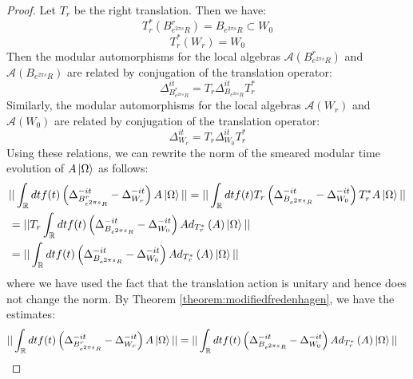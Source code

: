 \documentclass[a4paper,11pt]{article}
\theoremstyle{definition}
\newcommand{\lb}{\left(}
\newcommand{\rb}{\right)}
\begin{document}
\begin{proof}
    Let $T_r$ be the right translation. Then we have:
    \begin{equation}
        T_r^*\lb B^r_{e^{2\pi s}R}\rb = B_{e^{2\pi s}R}\subset W_0
    \end{equation}
    \begin{equation}
        T_r^*\lb W_r \rb = W_0
    \end{equation}
    Then the modular automorphisms for the local algebras $\mathcal{A}\lb B^r_{e^{2\pi s}R}\rb$ and $\mathcal{A}\lb B_{e^{2\pi s}R} \rb$ are related by conjugation of the translation operator:
    \begin{equation}
        \Delta^{it}_{B^r_{e^{2\pi s}R}} = T_r\Delta^{it}_{B_{e^{2\pi s}R}} T_r^*
    \end{equation}
    Similarly, the modular automorphisms for the local algebras $\mathcal{A}\lb W_r\rb$ and $\mathcal{A}\lb W_0\rb$ are related by conjugation of the translation operator:
    \begin{equation}
        \Delta^{it}_{W_r} = T_r\Delta^{it}_{W_0}T_r^*
    \end{equation}
    Using these relations, we can rewrite the norm of the smeared modular time evolution of $A\ket{\Omega}$ as follows:
    \begin{align}
        \begin{split}
            &||\int_\mathbb{R} dt f(t)\lb\Delta^{-it}_{B^r_{e^{2\pi s}R}} - \Delta^{-it}_{W_r}\rb A\ket{\Omega}|| = ||\int_\mathbb{R} dt f(t)T_r\lb\Delta^{-it}_{B_{e^{2\pi s}R}} - \Delta^{-it}_{W_0}\rb T^*_r A\ket{\Omega}||
            \\&
            =||T_r\int_\mathbb{R} dt f(t) \lb\Delta^{-it}_{B_{e^{2\pi s}R}}-\Delta^{-it}_{W_0}\rb Ad_{T_r^*}\lb A\rb\ket{\Omega}||
            \\&=||\int_\mathbb{R} dt f(t) \lb \Delta^{-it}_{B_{e^{2\pi s}R}} - \Delta^{-it}_{W_0}\rb Ad_{T^*_r}\lb A\rb\ket{\Omega}||
        \end{split}
    \end{align}
    where we have used the fact that the translation action is unitary and hence does not change the norm. By Theorem \ref{theorem:modifiedfredenhagen}, we have the estimates:
    \begin{align}
        \begin{split}
            &||\int_\mathbb{R} dt f(t) \lb \Delta^{-it}_{B^r_{e^{2\pi s}R}}- \Delta^{-it}_{W_r} \rb A\ket{\Omega}|| = ||\int_\mathbb{R} dt f(t) \lb \Delta^{-it}_{B_{e^{2\pi s}R}} - \Delta^{-it}_{W_0} \rb Ad_{T_r^*}\lb A\rb \ket{\Omega}||

\end{split}
\end{align}
\end{proof}
\end{document}

